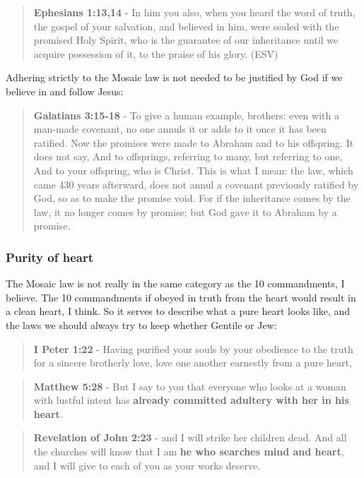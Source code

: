 \documentclass[11pt]{article}
\begin{document}
\begin{quote}
\textbf{Ephesians 1:13,14} -  In him you also, when you heard the word of truth, the gospel of your salvation, and believed in him, were sealed with the promised Holy Spirit, who is the guarantee of our inheritance until we acquire possession of it, to the praise of his glory.  (ESV)
\end{quote}

Adhering strictly to the Mosaic law is not needed to be justified by God if we believe in and follow Jesus:

\begin{quote}
\textbf{Galatians 3:15-18} - To give a human example, brothers: even with a man-made covenant, no one annuls it or adds to it once it has been ratified. Now the promises were made to Abraham and to his offspring. It does not say, And to offsprings, referring to many, but referring to one, And to your offspring, who is Christ. This is what I mean: the law, which came 430 years afterward, does not annul a covenant previously ratified by God, so as to make the promise void. For if the inheritance comes by the law, it no longer comes by promise; but God gave it to Abraham by a promise.
\end{quote}

\subsubsection{Purity of heart}
\label{sec:orgccf61a4}

The Mosaic law is not really in the same category as the 10 commandments, I believe. The 10 commandments if obeyed in truth from the heart would result in a clean heart, I think. So it serves to describe what a pure heart looks like, and the laws we should always try to keep whether Gentile or Jew:

\begin{quote}
\textbf{I Peter 1:22} - Having purified your souls by your obedience to the truth for a sincere brotherly love, love one another earnestly from a pure heart,
\end{quote}

\begin{quote}
\textbf{Matthew 5:28} - But I say to you that everyone who looks at a woman with lustful intent has \textbf{already committed adultery with her in his heart}.
\end{quote}

\begin{quote}
\textbf{Revelation of John 2:23} - and I will strike her children dead. And all the churches will know that I am \textbf{he who searches mind and heart}, and I will give to each of you as your works deserve.
\end{quote}
\end{document}
